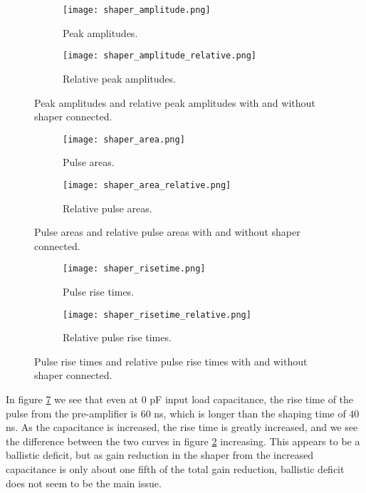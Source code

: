 \documentclass[../main/thesis.tex]{subfiles}
\begin{document}
\begin{figure}
	\centering
	\begin{subfigure}{.5\textwidth}
		\centering
		\texttt{[image: shaper\_amplitude.png]}
		\caption{Peak amplitudes.}
		\label{fig-IDE1180-shaperamp-}
	\end{subfigure}%
	\begin{subfigure}{.5\textwidth}
		\centering
		\texttt{[image: shaper\_amplitude\_relative.png]}
		\caption{Relative peak amplitudes.}
		\label{fig-IDE1180-shaperamp-rel} %
	\end{subfigure}
	\caption{Peak amplitudes and relative peak amplitudes with and without shaper connected.}
	\label{fig-IDE1180-shaperamp}
\end{figure}

\begin{figure}
	\centering
	\begin{subfigure}{.5\textwidth}
		\centering
		\texttt{[image: shaper\_area.png]}
		\caption{Pulse areas.}
		\label{fig-IDE1180-shaperarea-}
	\end{subfigure}%
	\begin{subfigure}{.5\textwidth}
		\centering
		\texttt{[image: shaper\_area\_relative.png]}
		\caption{Relative pulse areas.}
		\label{fig-IDE1180-shaperarea-rel} %
	\end{subfigure}
	\caption{Pulse areas and relative pulse areas with and without shaper connected.}
	\label{fig-IDE1180-shaperarea}
\end{figure}

\begin{figure}
	\centering
	\begin{subfigure}{.5\textwidth}
		\centering
		\texttt{[image: shaper\_risetime.png]}
		\caption{Pulse rise times.}
		\label{fig-IDE1180-shaperrisetime-}
	\end{subfigure}%
	\begin{subfigure}{.5\textwidth}
		\centering
		\texttt{[image: shaper\_risetime\_relative.png]}
		\caption{Relative pulse rise times.}
		\label{fig-IDE1180-shaperrisetime-rel} %
	\end{subfigure}
	\caption{Pulse rise times and relative pulse rise times with and without shaper connected.}
	\label{fig-IDE1180-shaperrisetime}
\end{figure}

In figure \ref{fig-IDE1180-shaperrisetime-} we see that even at 0 pF input load capacitance, the rise time of the pulse from the pre-amplifier is 60 ns, which is longer than the shaping time of 40 ns. As the capacitance is increased, the rise time is greatly increased, and we see the difference between the two curves in figure \ref{fig-IDE1180-shaperamp-rel} increasing. This appears to be a ballistic deficit, but as gain reduction in the shaper from the increased capacitance is only about one fifth of the total gain reduction, ballistic deficit does not seem to be the main issue.  
\end{document}
